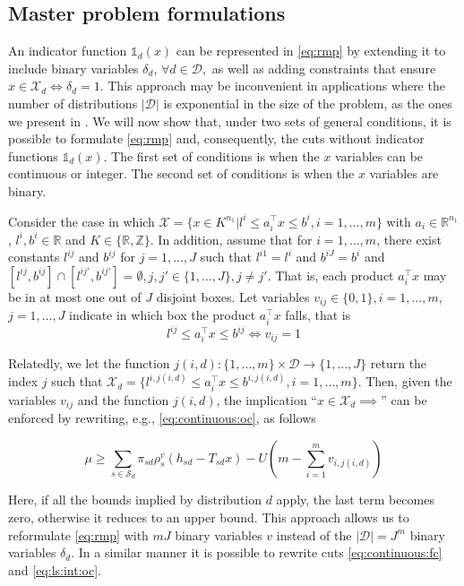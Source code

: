 \documentclass[12pt]{article}
\theoremstyle{thmstylethree}%
\newcommand{\mtc}[1] {\mathcal{#1}}
\def\R{\ensuremath{\mathbb{R}}}
\def\Ind{\ensuremath{\mathbb{1}}}
\begin{document}
\subsection{Master problem formulations}\label{sec:benders:mpformulations}
An indicator function $\Ind_d(x)$ can be represented in \eqref{eq:rmp} by extending it to include binary variables $\delta_d$, $\forall d \in \mtc{D},$ as well as adding constraints that ensure $x\in \mtc{X}_d\iff \delta_d = 1 .$  This approach may be inconvenient in applications where the number of distributions $\vert\mtc{D}\vert$ is exponential in the size of the problem, as the ones we present in . We will now show that, under two sets of general conditions, it is possible to formulate \eqref{eq:rmp} and, consequently, the cuts without indicator functions $\Ind_d(x)$. The first set of conditions is when the $x$ variables can be continuous or integer. The second set of conditions is when the $x$ variables are binary.

Consider the case in which $\mtc{X}=\{x\in K^{n_1}\vert l^i\leq a_i^\top x\leq b^i,i=1,\ldots,m\}$ with $a_i\in\R^{n_1}$, $l^i,b^i\in\R$ and $K\in \{\R,\mathbb{Z}\}$.
In addition, assume that for $i=1,\ldots,m$, there exist constants $l^{ij}$ and $b^{ij}$ for $j=1,\ldots,J$ such that $l^{i1}=l^i$ and $b^{iJ}=b^i$ and $[l^{ij},b^{ij}] \cap [l^{ij'},b^{ij'}] = \emptyset, j,j' \in \{1,\ldots,J\}, j \neq j'.$
That is, each product $a_i^\top x$ may be in at most one out of $J$ disjoint boxes. 
Let variables $v_{ij}\in\{0,1\}, i = 1,\ldots, m$, $j=1,\ldots,J$ indicate in which box the product $a_i^\top x$ falls, that is
$$l^{ij}\leq a_i^\top x\leq b^{ij}\iff v_{ij}=1$$

Relatedly, we let the function $j(i,d):\{1,\ldots,m\}\times \mtc{D}\to \{1,\ldots,J\}$ return the index $j$ such that $\mtc{X}_d=\{l^{i,j(i,d)}\leq a_i^\top x\leq b^{i,j(i,d)}, i=1,\ldots,m\}$.
Then, given the variables $v_{ij}$ and the function $j(i,d)$,  the implication ``$x\in\mtc{X}_d\implies$'' can be enforced by rewriting, e.g., \eqref{eq:continuous:oc}, as follows

$$\mu\geq \sum_{s\in\mtc{S}_d}\pi_{sd}\rho^v_s(h_{sd}-T_{sd}x) - U(m-\sum_{i=1}^mv_{i,j(i,d)})$$

Here, if all the bounds implied by distribution $d$ apply, the last term becomes zero, otherwise it reduces to an upper bound.
This approach allows us to reformulate \eqref{eq:rmp} with $mJ$ binary variables $v$ instead of the $|\mtc{D}|=J^m$ binary variables $\delta_d$.
In a similar manner it is possible to rewrite cuts \eqref{eq:continuous:fc} and \eqref{eq:ls:int:oc}.
\end{document}
